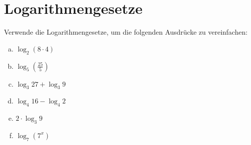 \section{Logarithmengesetze}

Verwende die Logarithmengesetze, um die folgenden Ausdrücke zu vereinfachen:

\begin{enumerate}[a)]
    \item \( \log_2 (8 \cdot 4) \)
    \item \( \log_5 \left(\frac{25}{5}\right) \)
    \item \( \log_3 27 + \log_3 9 \)
    \item \( \log_4 16 - \log_4 2 \)
    \item \( 2 \cdot \log_3 9 \)
    \item \( \log_7 (7^x) \)
\end{enumerate}
